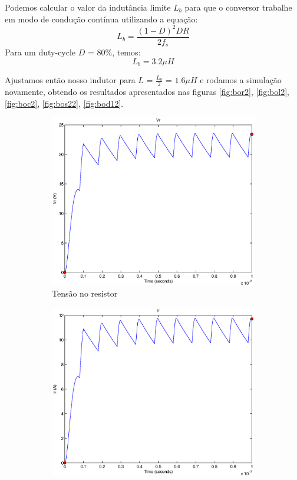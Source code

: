 \documentclass{article}
\begin{document}
Podemos calcular o valor da indutância limite $L_b$ para que o conversor trabalhe em modo de condução contínua utilizando a equação:
\begin{equation}
L_b = \frac{(1 - D)^2 DR}{2f_s}
\end{equation}
Para um duty-cycle $D$ = $80\%$, temos:
\begin{equation}
L_b =  3.2\mu H
\end{equation}

Ajustamos então nosso indutor para $L$ = $\frac{L_b}{2}$ = $1.6 \mu H$ e rodamos a simulação novamente, obtendo os resultados apresentados nas figuras \ref{fig:bor2}, \ref{fig:bol2}, \ref{fig:boc2}, \ref{fig:bos22}, \ref{fig:bod12}.

\begin{figure}[H]
	\centering
	\begin{subfigure}[b]{0.4\linewidth}
		\includegraphics[width=\linewidth]{matlab/boost/b_vr2}
		\caption{Tensão no resistor}
	\end{subfigure}
	\begin{subfigure}[b]{0.4\linewidth}
		\centering
		\includegraphics[width=\linewidth]{matlab/boost/b_ir2}

\end{subfigure}
\end{figure}
\end{document}
